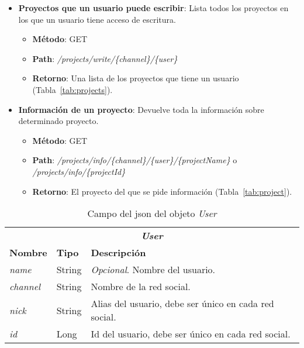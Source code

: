 \begin{itemize}
\begin{itemize}
	\end{itemize}
\item \textbf{Proyectos que un usuario puede escribir}: Lista todos los proyectos en los que un usuario tiene acceso de escritura.
	\begin{itemize}
	\item \textbf{Método}: GET
	\item \textbf{Path}: \textit{/projects/write/\{channel\}/\{user\}}
	\item \textbf{Retorno}: Una lista de los proyectos que tiene un usuario (Tabla~\ref{tab:projects}).
	\end{itemize}
\item \textbf{Información de un proyecto}: Devuelve toda la información sobre determinado proyecto.
	\begin{itemize}
	\item \textbf{Método}: GET
	\item \textbf{Path}: \textit{/projects/info/\{channel\}/\{user\}/\{projectName\}} o\\ \textit{/projects/info/\{projectId\}}
	\item \textbf{Retorno}: El proyecto del que se pide información (Tabla~\ref{tab:project}).
	\end{itemize}
\end{itemize}


\begin{table}[h]
\centering
\begin{tabular}{lll}
\multicolumn{3}{c}{\textit{\textbf{User}}}                                              \\
\textbf{Nombre}  & \textbf{Tipo} & \textbf{Descripción}                                 \\ \hline \hline
\textit{name}    & String        & \textit{Opcional}. Nombre del usuario.                        \\
\textit{channel} & String        & Nombre de la red social.                             \\
\textit{nick}    & String        & Alias del usuario, debe ser único en cada red social. \\
\textit{id}      & Long          & Id del usuario, debe ser único en cada red social.    \\ \hline
\end{tabular}
\caption{Campo del json del objeto \textit{User}}
\label{tab:user}
\end{table}

